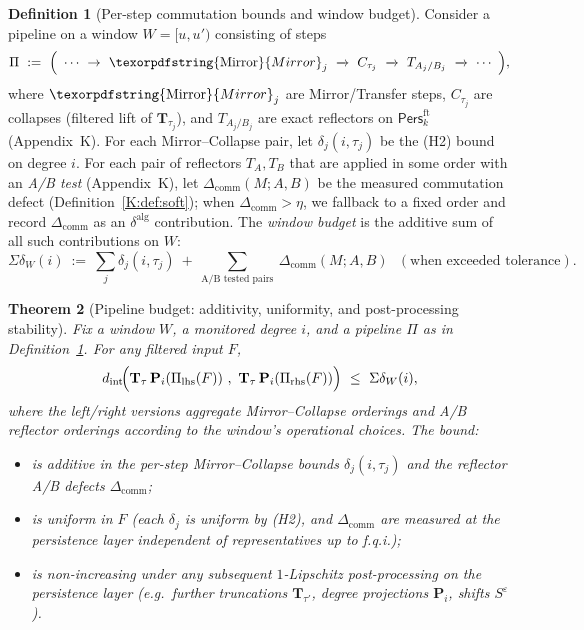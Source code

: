 \documentclass[11pt]{article}
\DeclareRobustCommand{\hyp}{\nobreakdash-}
\newcommand{\Pers}{\mathsf{Pers}}
\numberwithin{equation}{section}
\newtheorem{theorem}{Theorem}[section]
\theoremstyle{definition}
\newtheorem{definition}[theorem]{Definition}
\DeclareRobustCommand{\Mirror}{\texorpdfstring{\ensuremath{\operatorname{Mirror}}}{Mirror}}
\providecommand{\n}{\unskip\space}
\begin{document}
\begin{definition}[Per-step commutation bounds and window budget]\label{L:def:budget}
Consider a pipeline on a window \(W=[u,u')\) consisting of steps
\[
\Pi\ :=\ \Big(\ \cdots\ \rightarrow\ \Mirror_j\ \xrightarrow{}\ C_{\tau_j}\ \xrightarrow{}\ T_{A_j/B_j}\ \xrightarrow{}\ \cdots\ \Big),
\]
where \(\Mirror_j\) are Mirror/Transfer steps, \(C_{\tau_j}\) are collapses (filtered lift of \(\mathbf{T}_{\tau_j}\)), and \(T_{A_j/B_j}\) are exact reflectors on \(\Pers^{\mathrm{ft}}_k\) (Appendix~K). For each Mirror–Collapse pair, let \(\delta_j(i,\tau_j)\) be the (H2) bound on degree \(i\). For each pair of reflectors \(T_A,T_B\) that are applied in some order with an \emph{A/B test} (Appendix~K), let \(\Delta_{\mathrm{comm}}(M;A,B)\) be the measured commutation defect (Definition~\ref{K:def:soft}); when \(\Delta_{\mathrm{comm}}>\eta\), we fallback to a fixed order and record \(\Delta_{\mathrm{comm}}\) as an \(\delta^{\mathrm{alg}}\) contribution. The \emph{window budget} is the additive sum of all such contributions on \(W\):
\[
\Sigma\delta_W(i)\ :=\ \sum_{j}\delta_j(i,\tau_j)\ +\ \sum_{\text{A/B tested pairs}}\ \Delta_{\mathrm{comm}}(M;A,B)\ \ \ (\text{when exceeded tolerance}).
\]
\end{definition}

\begin{theorem}[Pipeline budget: additivity, uniformity, and post-processing stability]\label{L:thm:budget}
Fix a window \(W\), a monitored degree \(i\), and a pipeline \(\Pi\) as in Definition~\ref{L:def:budget}. For any filtered input \(F\),
\[
d_{\mathrm{int}}\!\Big(
      \mathbf{T}_\tau\,\mathbf{P}_i(\Pi_{\text{lhs}}(F))\ ,\ 
      \mathbf{T}_\tau\,\mathbf{P}_i(\Pi_{\text{rhs}}(F))\n  \Big)\ \le\ \Sigma\delta_W(i),
\]
where the left/right versions aggregate Mirror–Collapse orderings and A/B reflector orderings according to the window’s operational choices. The bound:
\begin{itemize}\itemsep0.2em
  \item is \emph{additive} in the per-step Mirror–Collapse bounds \(\delta_j(i,\tau_j)\) and the reflector A/B defects \(\Delta_{\mathrm{comm}}\);
  \item is \emph{uniform in \(F\)} (each \(\delta_j\) is uniform by (H2), and \(\Delta_{\mathrm{comm}}\) are measured at the persistence layer independent of representatives up to f.q.i.);
  \item is \emph{non-increasing} under any subsequent \(1\)\hyp Lipschitz post\hyp processing on the persistence layer (e.g.\ further truncations \(\mathbf{T}_{\tau'}\), degree projections \(\mathbf{P}_i\), shifts \(S^\varepsilon\)).
\end{itemize}
\end{theorem}
\end{document}
